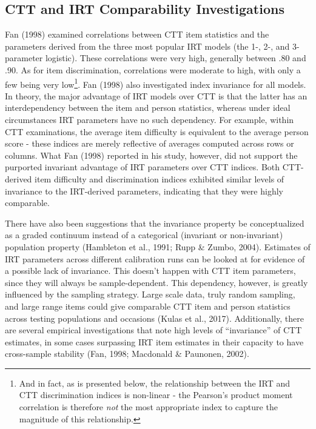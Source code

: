 \documentclass[
  man]{apa6}
\begin{document}
\hypertarget{ctt-and-irt-comparability-investigations}{%
\subsection{CTT and IRT Comparability Investigations}\label{ctt-and-irt-comparability-investigations}}

Fan (1998) examined correlations between CTT item statistics and the parameters derived from the three most popular IRT models (the 1-, 2-, and 3-parameter logistic). These correlations were very high, generally between .80 and .90. As for item discrimination, correlations were moderate to high, with only a few being very low\footnote{And in fact, as is presented below, the relationship between the IRT and CTT discrimination indices is non-linear - the Pearson's product moment correlation is therefore \emph{not} the most appropriate index to capture the magnitude of this relationship.}. Fan (1998) also investigated index invariance for all models. In theory, the major advantage of IRT models over CTT is that the latter has an interdependency between the item and person statistics, whereas under ideal circumstances IRT parameters have no such dependency. For example, within CTT examinations, the average item difficulty is equivalent to the average person score - these indices are merely reflective of averages computed across rows or columns. What Fan (1998) reported in his study, however, did not support the purported invariant advantage of IRT parameters over CTT indices. Both CTT-derived item difficulty and discrimination indices exhibited similar levels of invariance to the IRT-derived parameters, indicating that they were highly comparable.

There have also been suggestions that the invariance property be conceptualized as a graded continuum instead of a categorical (invariant or non-invariant) population property (Hambleton et al., 1991; Rupp \& Zumbo, 2004). Estimates of IRT parameters across different calibration runs can be looked at for evidence of a possible lack of invariance. This doesn't happen with CTT item parameters, since they will always be sample-dependent. This dependency, however, is greatly influenced by the sampling strategy. Large scale data, truly random sampling, and large range items could give comparable CTT item and person statistics across testing populations and occasions (Kulas et al., 2017). Additionally, there are several empirical investigations that note high levels of ``invariance'' of CTT estimates, in some cases surpassing IRT item estimates in their capacity to have cross-sample stability (Fan, 1998; Macdonald \& Paunonen, 2002).
\end{document}

